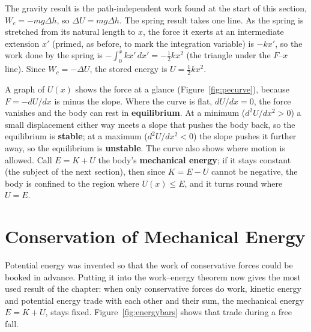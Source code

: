 The gravity result is the path-independent work found at the start of this section, $W_c=-mg\Delta h$,
so $\Delta U=mg\Delta h$. The spring result takes one line. As the spring is stretched from its natural
length to $x$, the force it exerts at an intermediate extension $x'$ (primed, as before, to mark the
integration variable) is $-kx'$, so the work done by the spring is
$-\int_0^x kx'\,dx'=-\tfrac12kx^2$ (the triangle under the $F$--$x$ line). Since $W_c=-\Delta U$, the
stored energy is $U=\tfrac12kx^2$.

A graph of $U(x)$ shows the force at a glance (Figure~\ref{fig:pecurve}), because $F=-dU/dx$ is minus the
slope. Where the curve is flat, $dU/dx=0$, the force vanishes and the body can rest in
\textbf{equilibrium}. At a minimum ($d^2U/dx^2>0$) a small displacement either way meets a slope that
pushes the body back, so the equilibrium is \textbf{stable}; at a maximum ($d^2U/dx^2<0$) the slope
pushes it further away, so the equilibrium is \textbf{unstable}. The curve also shows where motion is
allowed. Call $E=K+U$ the body's \textbf{mechanical energy}; if it stays constant (the subject of the
next section), then since $K=E-U$ cannot be negative, the body is confined to the region
where $U(x)\le E$, and it turns round where $U=E$.

\section{Conservation of Mechanical Energy}

Potential energy was invented so that the work of conservative forces could be booked in advance. Putting
it into the work--energy theorem now gives the most used result of the chapter: when only conservative
forces do work, kinetic energy and potential energy trade with each other and their sum, the mechanical
energy $E=K+U$, stays fixed. Figure~\ref{fig:energybars} shows that trade during a free fall.

\begin{figure}[htbp]
\centering
{}

\end{figure}

